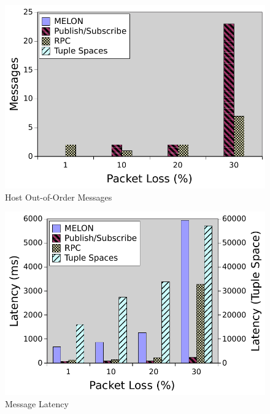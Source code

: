 \begin{figure}
\centering
\includegraphics[width = \textwidth]{figures/hooo.pdf}
\caption{Host Out-of-Order Messages}
\label{fig:hooo}
\end{figure}

\begin{figure}
\centering
\includegraphics[width = \textwidth]{figures/latency.pdf}
\caption{Message Latency}
\label{fig:latency}
\end{figure}

